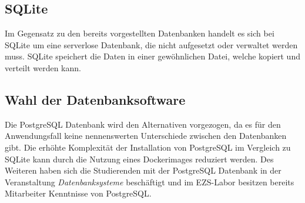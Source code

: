 \subsection{SQLite}
Im Gegensatz zu den bereits vorgestellten Datenbanken handelt es sich bei SQLite um eine serverlose Datenbank, die nicht aufgesetzt oder verwaltet werden muss. SQLite speichert die Daten in einer gewöhnlichen Datei, welche kopiert und verteilt werden kann. \cite{sqliteFeaturesSQLite}

\subsection{Wahl der Datenbanksoftware}
Die PostgreSQL Datenbank wird den Alternativen vorgezogen, da es für den Anwendungsfall keine nennenswerten Unterschiede zwischen den Datenbanken gibt. Die erhöhte Komplexität der Installation von PostgreSQL im Vergleich zu SQLite kann durch die Nutzung eines Dockerimages reduziert werden. Des Weiteren haben sich die Studierenden mit der \linebreak PostgreSQL Datenbank in der Veranstaltung \textit{Datenbanksysteme} beschäftigt und im EZS-Labor besitzen bereits Mitarbeiter Kenntnisse von PostgreSQL.